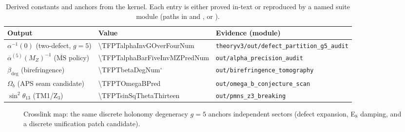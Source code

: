 \begin{table}[H]
\centering
\begin{tabular}{@{}lll@{}}
\toprule
Output & Value & Evidence (module) \\
\midrule
$\alpha^{-1}(0)$ (two-defect, $g=5$) & \num[round-mode=places,round-precision=12]{\TFPTalphaInvGOverFourNum} & \texttt{theoryv3/out/defect\_partition\_g5\_audit} \\
$\overline{\alpha}^{(5)}(M_Z)^{-1}$ ($\overline{\mathrm{MS}}$ policy) & \num[round-mode=places,round-precision=6]{\TFPTalphaBarFiveInvMZPredNum} & \texttt{out/alpha\_precision\_audit} \\
$\beta_{\mathrm{deg}}$ (birefringence) & \num[round-mode=places,round-precision=4]{\TFPTbetaDegNum}$^\circ$ & \texttt{out/birefringence\_tomography} \\
$\Omega_b$ (APS seam candidate) & \num[round-mode=places,round-precision=6]{\TFPTOmegaBPred} & \texttt{out/omega\_b\_conjecture\_scan} \\
$\sin^2\theta_{13}$ (TM1/Z$_3$) & \num[round-mode=places,round-precision=6]{\TFPTsinSqThetaThirteen} & \texttt{out/pmns\_z3\_breaking} \\
\bottomrule
\end{tabular}
\caption{Derived constants and anchors from the kernel. Each entry is either proved in-text or reproduced by a named suite module (paths in  and , or ).}
\label{tab:constant-factory}
\end{table}

\begin{figure}[H]
\centering
{}
\caption{Crosslink map: the same discrete holonomy degeneracy $g=5$ anchors independent sectors (defect expansion, E$_8$ damping, and a discrete unification patch candidate).}
\label{fig:crosslink}
\end{figure}

